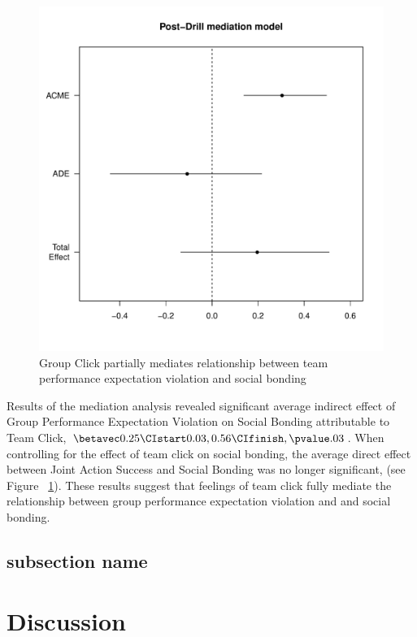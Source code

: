 \begin{figure}
  \centering
  \includegraphics{images/groupPerfExpClickMediationPlot}
  \caption{Group Click partially mediates relationship between team performance expectation violation and social bonding}
  \label{fig:groupPerfExpClickMediationPlot}
\end{figure}

Results of the mediation analysis revealed significant average indirect effect of Group Performance Expectation Violation on Social Bonding attributable to Team Click, $\betavec 0.25 \CIstart 0.03, 0.56 \CIfinish, \pvalue .03$. When controlling for the effect of team click on social bonding, the average direct effect between Joint Action Success and Social Bonding was no longer significant, (see Figure ~\ref{fig:groupPerfExpClickMediationPlot}).  These results suggest that feelings of team click fully mediate the relationship between group performance expectation violation and and social bonding.





\subsection{subsection name}





\section{Discussion}
